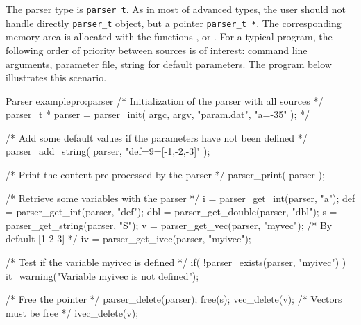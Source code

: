 The parser type is \texttt{parser\_t}. As in most of advanced types, the
user should not handle directly \texttt{parser\_t} object, but a pointer
\texttt{parser\_t *}.  The corresponding memory area is allocated with the
functions ,
 or .  
For a typical program, the following order of priority between sources is of
interest: command line arguments, parameter file, string for default
parameters.  The program below illustrates this scenario.

\begin{program}{Parser example}{pro:parser}
  /* Initialization of the parser with all sources                   */
  parser_t * parser = parser_init( argc, argv, "param.dat", "a=-35" ); */

  /* Add some default values if the parameters have not been defined */
  parser_add_string( parser, "def=9\nmyvec=[-1,-2,-3]" );

  /* Print the content pre-processed by the parser                   */
  parser_print( parser );

  /* Retrieve some variables with the parser                         */
  i   = parser_get_int(parser, "a");
  def = parser_get_int(parser, "def");
  dbl = parser_get_double(parser, "dbl");
  s   = parser_get_string(parser, "S");
  v   = parser_get_vec(parser, "myvec");       /* By default [1 2 3] */
  iv  = parser_get_ivec(parser, "myivec");

  /* Test if the variable myivec is defined                          */
  if( !parser_exists(parser, "myivec") )
    it_warning("Variable myivec is not defined\n");

  /* Free the pointer                                                */
  parser_delete(parser);   
  free(s);
  vec_delete(v);                             /* Vectors must be free */
  ivec_delete(v);
\end{program}


